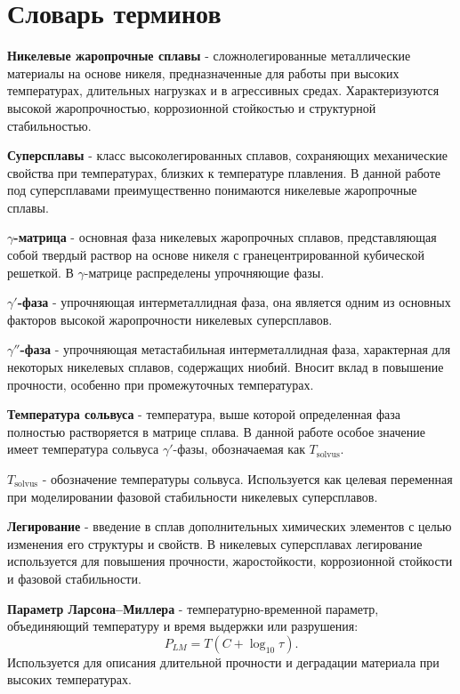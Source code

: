 \chapter*{\centering Словарь терминов}


\textbf{Никелевые жаропрочные сплавы} - сложнолегированные 
металлические материалы на основе никеля, предназначенные для 
работы при высоких температурах, длительных нагрузках и в 
агрессивных средах. Характеризуются высокой жаропрочностью, 
коррозионной стойкостью и структурной стабильностью.

\textbf{Суперсплавы} - класс высоколегированных сплавов, сохраняющих 
механические свойства при температурах, близких к температуре 
плавления. В данной работе под суперсплавами преимущественно 
понимаются никелевые жаропрочные сплавы.

\textbf{$\gamma$-матрица} - основная фаза никелевых жаропрочных 
сплавов, представляющая собой твердый раствор на основе никеля с 
гранецентрированной кубической решеткой. В $\gamma$-матрице 
распределены упрочняющие фазы.

\textbf{$\gamma'$-фаза} -
упрочняющая интерметаллидная фаза, она является одним из основных 
факторов высокой жаропрочности никелевых суперсплавов.

\textbf{$\gamma''$-фаза} - упрочняющая метастабильная интерметаллидная
фаза, характерная для некоторых никелевых сплавов, содержащих 
ниобий. Вносит вклад в повышение прочности, особенно при 
промежуточных температурах.

\textbf{Температура сольвуса} - температура, выше которой определенная
фаза полностью растворяется в матрице сплава. В данной работе особое 
значение имеет температура сольвуса $\gamma'$-фазы, обозначаемая как 
$T_{\mathrm{solvus}}$.

\textbf{$T_{\mathrm{solvus}}$} -
обозначение температуры сольвуса. Используется как целевая переменная 
при моделировании фазовой стабильности никелевых суперсплавов.

\textbf{Легирование} -
введение в сплав дополнительных химических элементов с целью изменения
его структуры и свойств. В никелевых суперсплавах легирование 
используется для повышения прочности, жаростойкости, коррозионной 
стойкости и фазовой стабильности.

\textbf{Параметр Ларсона--Миллера} - температурно-временной параметр, 
объединяющий температуру и время выдержки или разрушения:
$$P_{LM}=T(C+\log_{10}\tau).$$
Используется для описания длительной прочности и деградации материала
при высоких температурах.

